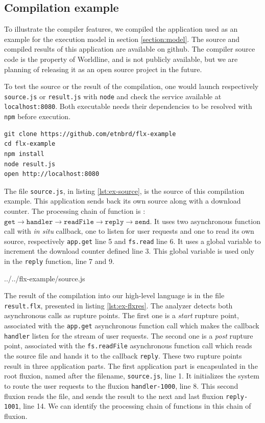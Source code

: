 \subsection{Compilation example} \label{section:example}

To illustrate the compiler features, we compiled the application used as an example for the execution model in section \ref{section:model}.
The source and compiled results of this application are available on github\cite{flx-example}.
The compiler source code is the property of Worldline, and is not publicly available, but we are planning of releasing it as an open source project in the future.

To test the source or the result of the compilation, one would launch respectively \texttt{source.js} or \texttt{result.js} with \texttt{node} and check the service available at \texttt{localhost:8080}.
Both executable needs their dependencies to be resolved with \texttt{npm} before execution.
\begin{verbatim}
git clone https://github.com/etnbrd/flx-example
cd flx-example
npm install
node result.js
open http://localhost:8080
\end{verbatim}

The file \texttt{source.js}, in listing \ref{lst:ex-source}, is the source of this compilation example.
This application sends back its own source along with a download counter.
The processing chain of function is : $\texttt{get} \to \texttt{handler} \to \texttt{readFile} \to \texttt{reply} \to \texttt{send}$.
It uses two asynchronous function call with \textit{in situ} callback, one to listen for user requests and one to read its own source, respectively \texttt{app.get} line 5 and \texttt{fs.read} line 6.
It uses a global variable to increment the download counter defined line 3.
This global variable is used only in the \texttt{reply} function, line 7 and 9.

{../../flx-example/source.js}

The result of the compilation into our high-level language is in the file \texttt{result.flx}, presented in listing \ref{lst:ex-flxres}.
The analyzer detects both asynchronous calls as rupture points.
The first one is a \textit{start} rupture point, associated with the \texttt{app.get} asynchronous function call which makes the callback \texttt{handler} listen for the stream of user requests. 
The second one is a \textit{post} rupture point, associated with the \texttt{fs.readFile} asynchronous function call which reads the source file and hands it to the callback \texttt{reply}.
These two rupture points result in three application parts.
The first application part is encapsulated in the root fluxion, named after the filename, \texttt{source.js}, line 1.
It initializes the system to route the user requests to the fluxion \texttt{handler-1000}, line 8.
This second fluxion reads the file, and sends the result to the next and last fluxion \texttt{reply-1001}, line 14.
We can identify the processing chain of functions in this chain of fluxion.

